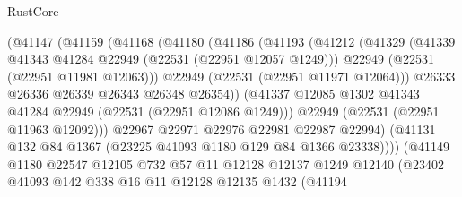 \begin{lexlean}{RustCore}
\begin{coremodule}
                          (@41147
                            (@41159
                              (@41168
                                (@41180
                                  (@41186
                                    (@41193
                                      (@41212
                                        (@41329
                                          (@41339
                                            @41343
                                            @41284
                                            @22949
                                            (@22531 (@22951 @12057 @1249)))
                                          @22949
                                          (@22531 (@22951 @11981 @12063)))
                                        @22949
                                        (@22531 (@22951 @11971 @12064)))
                                      @26333
                                      @26336
                                      @26339
                                      @26343
                                      @26348
                                      @26354))
                                  (@41337
                                    @12085
                                    @1302
                                    @41343
                                    @41284
                                    @22949
                                    (@22531 (@22951 @12086 @1249)))
                                  @22949
                                  (@22531 (@22951 @11963 @12092)))
                                @22967
                                @22971
                                @22976
                                @22981
                                @22987
                                @22994)
                              (@41131 @132 @84 @1367 (@23225 @41093 @1180 @129 @84 @1366 @23338))))
                          (@41149
                            @1180
                            @22547
                            @12105
                            @732
                            @57
                            @11
                            @12128
                            @12137
                            @1249
                            @12140
                            (@23402
                              @41093
                              @142
                              @338
                              @16
                              @11
                              @12128
                              @12135
                              @1432
                              (@41194

\end{coremodule}
\end{lexlean}

